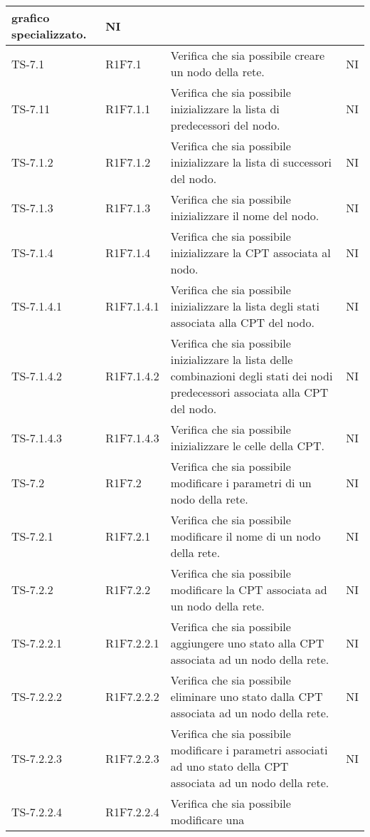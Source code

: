 \begin{longtable}{|C{2.5cm}|C{2.5cm}|C{6.5cm}|C{1.5cm}|}
			grafico specializzato.  & {NI}\\
			\hline
			{TS-7.1} & {R1F7.1} & Verifica che sia possibile creare un nodo
			della rete.  & {NI}\\
			\hline
			{TS-7.11} & {R1F7.1.1} & Verifica che sia  possibile inizializzare la lista di predecessori
			del nodo.  & {NI}\\
			\hline
			{TS-7.1.2} & {R1F7.1.2} & Verifica che sia possibile inizializzare la lista di successori del
			nodo.  & {NI}\\
			\hline
			{TS-7.1.3} & {R1F7.1.3} & Verifica che sia possibile inizializzare il nome del nodo.  & {NI}\\
			\hline
			{TS-7.1.4} & {R1F7.1.4} & Verifica che sia possibile inizializzare la CPT associata al
			nodo.  & {NI}\\
			\hline
			{TS-7.1.4.1} & {R1F7.1.4.1} & Verifica che sia possibile inizializzare la lista degli stati
			associata alla CPT del nodo.  & {NI}\\
			\hline
			{TS-7.1.4.2} & {R1F7.1.4.2} & Verifica che sia possibile inizializzare la lista delle
			combinazioni degli stati dei nodi
			predecessori associata alla CPT del
			nodo.  & {NI}\\
			\hline
			{TS-7.1.4.3} & {R1F7.1.4.3} & Verifica che sia possibile inizializzare le celle della CPT.  & {NI}\\
			\hline
			{TS-7.2} & {R1F7.2} & Verifica che sia possibile modificare i
			parametri di un nodo della rete.  & {NI}\\
			\hline
			{TS-7.2.1} & {R1F7.2.1} & Verifica che sia  possibile modificare il
			nome di un nodo della rete.  & {NI}\\
			\hline
			{TS-7.2.2} & {R1F7.2.2} & Verifica che sia possibile modificare la
			CPT associata ad un nodo della rete.  & {NI}\\
			\hline
			{TS-7.2.2.1} & {R1F7.2.2.1} & Verifica che sia possibile aggiungere uno
			stato alla CPT associata ad un nodo
			della rete.
  & {NI}\\
			\hline
			{TS-7.2.2.2} & {R1F7.2.2.2} & Verifica che sia possibile eliminare uno
			stato dalla CPT associata ad un nodo
			della rete.  & {NI}\\
			\hline
			{TS-7.2.2.3} & {R1F7.2.2.3} & Verifica che sia possibile modificare i
			parametri associati ad uno stato della
			CPT associata ad un nodo della rete.  & {NI}\\
			\hline
			{TS-7.2.2.4} & {R1F7.2.2.4} & Verifica che sia possibile modificare una

\end{longtable}
